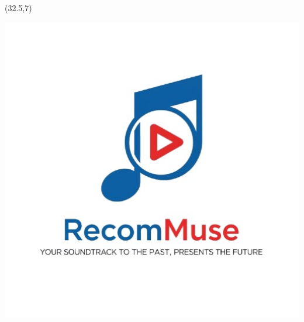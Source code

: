\documentclass{beamer}
\begin{document}
\begin{frame}

%
%

\begin{textblock}{35}(32.5,7)
	\begin{blankbox}[
        fontupper=\comic\fontsize{95}{45}\selectfont,
        colupper=white!75,
        halign=center
    ]

		\vspace{2cm}

        \includegraphics[width=1\textwidth]{img/RecomMuseLogo.jpg}
	\end{blankbox}
\end{textblock}



\end{frame}
\end{document}
